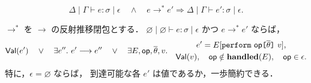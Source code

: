 \begin{lemma}[多歩の型保存]
\label{lem:fxi-multistep-preservation}
\[
  \Delta\mid\Gamma\vdash e:\sigma\mid\epsilon
  \quad\land\quad
  e\longrightarrow^{*}e'
  \Longrightarrow
  \Delta\mid\Gamma\vdash e':\sigma\mid\epsilon.
\]
\end{lemma}

\begin{theorem}
\label{thm:fxi-effect-safety}
$\longrightarrow^{*}$ を $\longrightarrow$ の反射推移閉包とする．
$\varnothing\mid\varnothing\vdash e:\sigma\mid\epsilon$
かつ $e\longrightarrow^{*}e'$ ならば，
\[
  \mathsf{Val}(e')
  \quad\lor\quad
  \exists e''.\ e'\longrightarrow e''
  \quad\lor\quad
  \exists E,\mathsf{op},\overline{\theta},v.\quad
    \begin{gathered}
      e'=E[\texttt{perform}~\mathsf{op}
           \texttt{[} \overline{\theta} \texttt{]}~v],\\
      \mathsf{Val}(v),\quad
      \mathsf{op}\notin\mathbf{handled}(E),\quad
      \mathsf{op}\in\epsilon.
    \end{gathered}
\]
特に，$\epsilon=\varnothing$ ならば，
到達可能な各 $e'$ は値であるか，一歩簡約できる．
\end{theorem}
